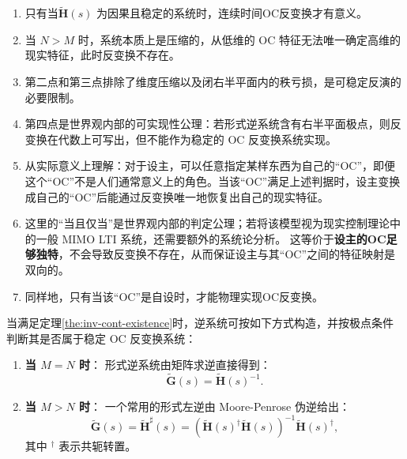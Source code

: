 \begin{remark}
    \begin{enumerate}
        \item 只有当\(\tilde{\mathbf{H}}(s)\) 为因果且稳定的系统时，连续时间OC反变换才有意义。
        \item 当 $N > M$ 时，系统本质上是压缩的，从低维的 OC 特征无法唯一确定高维的现实特征，此时反变换不存在。
        \item 第二点和第三点排除了维度压缩以及闭右半平面内的秩亏损，是可稳定反演的必要限制。
        \item 第四点是世界观内部的可实现性公理：若形式逆系统含有右半平面极点，则反变换在代数上可写出，但不能作为稳定的 OC 反变换系统实现。
        \item 从实际意义上理解：对于设主，可以任意指定某样东西为自己的“OC”，即便这个“OC”不是人们通常意义上的角色。当该“OC”满足上述判据时，设主变换成自己的“OC”后能通过反变换唯一地恢复出自己的现实特征。
        \item 这里的“当且仅当”是\wkn{}世界观内部的判定公理；若将该模型视为现实控制理论中的一般 MIMO LTI 系统，还需要额外的系统论分析。
              这等价于\textbf{设主的OC足够独特}，不会导致反变换不存在，从而保证设主与其“OC”之间的特征映射是双向的。
        \item 同样地，只有当该“OC”是自设时，才能物理实现OC反变换。
    \end{enumerate}
\end{remark}

\begin{theorem}[形式逆系统的构造]
    当满足定理\ref{the:inv-cont-existence}时，逆系统可按如下方式构造，并按极点条件判断其是否属于稳定 OC 反变换系统：

    \begin{enumerate}
        \item \textbf{当 $M = N$ 时}：
              形式逆系统由矩阵求逆直接得到：
              \begin{equation}
                  \tilde{\mathbf{G}}(s) = \tilde{\mathbf{H}}(s)^{-1}.
              \end{equation}

        \item \textbf{当 $M > N$ 时}：
              一个常用的形式左逆由 Moore-Penrose 伪逆给出：
              \begin{equation}
                  \tilde{\mathbf{G}}(s)=\tilde{\mathbf{H}}^{\sharp}(s) = \left( \tilde{\mathbf{H}}(s)^\dagger \tilde{\mathbf{H}}(s) \right)^{-1} \tilde{\mathbf{H}}(s)^\dagger,
              \end{equation}
              其中 $^\dagger$ 表示共轭转置。
    \end{enumerate}
\end{theorem}


